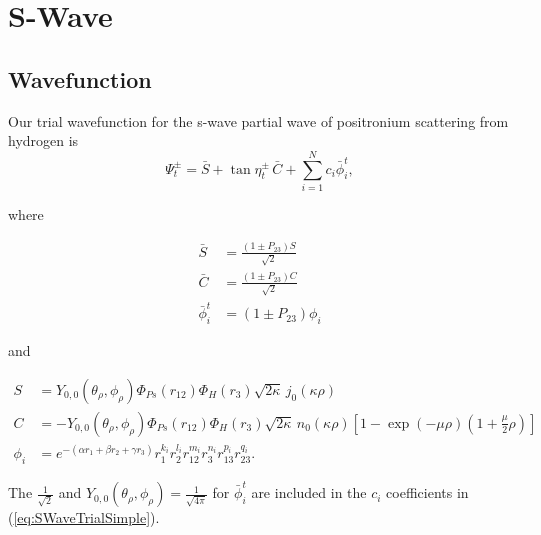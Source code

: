 \documentclass[Dissertation.tex]{subfiles}
\begin{document}
\chapter{S-Wave}
\label{chp:SWave}

\section{Wavefunction}
\label{sec:SWaveFn}
Our trial wavefunction for the s-wave partial wave of positronium scattering from hydrogen is
\begin{equation}
\Psi_t^\pm = \bar{S} + \tan \eta_t^\pm \, \bar{C} + \sum_{i=1}^N c_i \bar{\phi}_i^t ,
\label{eq:SWaveTrialSimple}
\end{equation}

\noindent where

\begin{subequations}\label{SCphiBarDef}
\begin{align}
\bar{S} &= \frac{\left( 1 \pm P_{23} \right) S}{\sqrt{2}} \label{SBarDef} \\
\bar{C} &= \frac{\left( 1 \pm P_{23} \right) C}{\sqrt{2}} \label{CBarDef} \\
\bar{\phi}_i^t &= \left( 1 \pm P_{23} \right) \phi_i \label{PhiBarDef}
\end{align}
\end{subequations}

\noindent and

\begin{subequations}\label{eq:SCPhiDef}
\begin{align}
S &= Y_{0,0}\!\left( \theta_\rho, \phi_\rho \right) \Phi_{Ps}\left(r_{12}\right) \Phi_H\left(r_3\right) \sqrt{2\kappa} \,j_0\!\left(\kappa\rho\right) \label{eq:SDef} \\
C &= -Y_{0,0}\!\left( \theta_\rho, \phi_\rho \right) \Phi_{Ps}\left(r_{12}\right) \Phi_H\left(r_3\right) \sqrt{2\kappa} \,n_0\!\left(\kappa\rho\right) \left[1 - \exp(-\mu \rho) (1+\frac{\mu}{2}\rho)\right] \label{eq:CDef} \\
\phi_i &= e^{-\left(\alpha r_1 + \beta r_2 + \gamma r_3 \right)} r_1^{k_i} r_2^{l_i} r_{12}^{m_i} r_3^{n_i} r_{13}^{p_i} r_{23}^{q_i}. \label{eq:PhiDef}
\end{align}
\end{subequations}

\noindent The $\frac{1}{\sqrt{2}}$ and $Y_{0,0}\left( \theta_\rho, \phi_\rho \right) = \frac{1}{\sqrt{4\pi}}$ for $\bar{\phi}_i^t$ are included in the $c_i$ coefficients in (\ref{eq:SWaveTrialSimple}).
\end{document}
